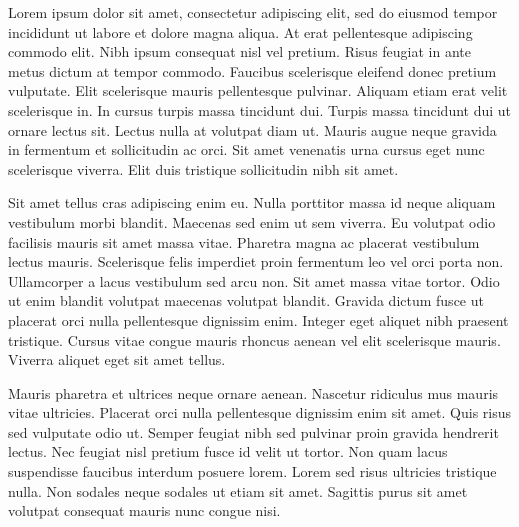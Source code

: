 Lorem ipsum dolor sit amet, consectetur adipiscing elit, sed do eiusmod tempor incididunt ut labore et dolore magna aliqua. At erat pellentesque adipiscing commodo elit. Nibh ipsum consequat nisl vel pretium. Risus feugiat in ante metus dictum at tempor commodo. Faucibus scelerisque eleifend donec pretium vulputate. Elit scelerisque mauris pellentesque pulvinar. Aliquam etiam erat velit scelerisque in. In cursus turpis massa tincidunt dui. Turpis massa tincidunt dui ut ornare lectus sit. Lectus nulla at volutpat diam ut. Mauris augue neque gravida in fermentum et sollicitudin ac orci. Sit amet venenatis urna cursus eget nunc scelerisque viverra. Elit duis tristique sollicitudin nibh sit amet.

Sit amet tellus cras adipiscing enim eu. Nulla porttitor massa id neque aliquam vestibulum morbi blandit. Maecenas sed enim ut sem viverra. Eu volutpat odio facilisis mauris sit amet massa vitae. Pharetra magna ac placerat vestibulum lectus mauris. Scelerisque felis imperdiet proin fermentum leo vel orci porta non. Ullamcorper a lacus vestibulum sed arcu non. Sit amet massa vitae tortor. Odio ut enim blandit volutpat maecenas volutpat blandit. Gravida dictum fusce ut placerat orci nulla pellentesque dignissim enim. Integer eget aliquet nibh praesent tristique. Cursus vitae congue mauris rhoncus aenean vel elit scelerisque mauris. Viverra aliquet eget sit amet tellus.

Mauris pharetra et ultrices neque ornare aenean. Nascetur ridiculus mus mauris vitae ultricies. Placerat orci nulla pellentesque dignissim enim sit amet. Quis risus sed vulputate odio ut. Semper feugiat nibh sed pulvinar proin gravida hendrerit lectus. Nec feugiat nisl pretium fusce id velit ut tortor. Non quam lacus suspendisse faucibus interdum posuere lorem. Lorem sed risus ultricies tristique nulla. Non sodales neque sodales ut etiam sit amet. Sagittis purus sit amet volutpat consequat mauris nunc congue nisi.

